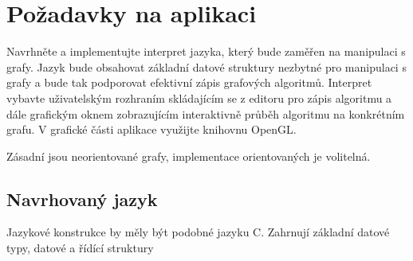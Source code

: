\documentclass[11pt,twoside,a4paper]{book}
\begin{document}


\section{Požadavky na aplikaci}

Navrhněte a implementujte interpret jazyka, který bude zaměřen na manipulaci s grafy. Jazyk bude obsahovat základní datové struktury nezbytné pro manipulaci s grafy a bude tak podporovat efektivní zápis grafových algoritmů. Interpret vybavte uživatelským rozhraním skládajícím se z editoru pro zápis algoritmu a dále grafickým oknem zobrazujícím interaktivně průběh algoritmu na konkrétním grafu. V grafické části aplikace využijte knihovnu OpenGL.

Zásadní jsou neorientované grafy, implementace orientovaných je volitelná.

\subsection{Navrhovaný jazyk}

Jazykové konstrukce by měly být podobné jazyku C. Zahrnují základní datové typy, datové a řídící struktury
\end{document}
